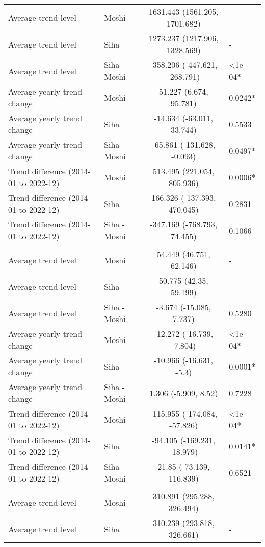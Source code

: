 \begin{longtable}{l|lcl}
Average trend level & Moshi & 1631.443 (1561.205, 1701.682) & - \\ 
Average trend level & Siha & 1273.237 (1217.906, 1328.569) & - \\ 
Average trend level & Siha - Moshi & -358.206 (-447.621, -268.791) & <1e-04* \\ 
Average yearly trend change & Moshi & 51.227 (6.674, 95.781) & 0.0242* \\ 
Average yearly trend change & Siha & -14.634 (-63.011, 33.744) & 0.5533 \\ 
Average yearly trend change & Siha - Moshi & -65.861 (-131.628, -0.093) & 0.0497* \\ 
Trend difference (2014-01 to 2022-12) & Moshi & 513.495 (221.054, 805.936) & 0.0006* \\ 
Trend difference (2014-01 to 2022-12) & Siha & 166.326 (-137.393, 470.045) & 0.2831 \\ 
Trend difference (2014-01 to 2022-12) & Siha - Moshi & -347.169 (-768.793, 74.455) & 0.1066 \\ 
\midrule\addlinespace[2.5pt]
\multicolumn{4}{l}{Malnutrition} \\ 
\midrule\addlinespace[2.5pt]
Average trend level & Moshi & 54.449 (46.751, 62.146) & - \\ 
Average trend level & Siha & 50.775 (42.35, 59.199) & - \\ 
Average trend level & Siha - Moshi & -3.674 (-15.085, 7.737) & 0.5280 \\ 
Average yearly trend change & Moshi & -12.272 (-16.739, -7.804) & <1e-04* \\ 
Average yearly trend change & Siha & -10.966 (-16.631, -5.3) & 0.0001* \\ 
Average yearly trend change & Siha - Moshi & 1.306 (-5.909, 8.52) & 0.7228 \\ 
Trend difference (2014-01 to 2022-12) & Moshi & -115.955 (-174.084, -57.826) & <1e-04* \\ 
Trend difference (2014-01 to 2022-12) & Siha & -94.105 (-169.231, -18.979) & 0.0141* \\ 
Trend difference (2014-01 to 2022-12) & Siha - Moshi & 21.85 (-73.139, 116.839) & 0.6521 \\ 
\midrule\addlinespace[2.5pt]
\multicolumn{4}{l}{Diarrhea} \\ 
\midrule\addlinespace[2.5pt]
Average trend level & Moshi & 310.891 (295.288, 326.494) & - \\ 
Average trend level & Siha & 310.239 (293.818, 326.661) & - \\ 

\end{longtable}
